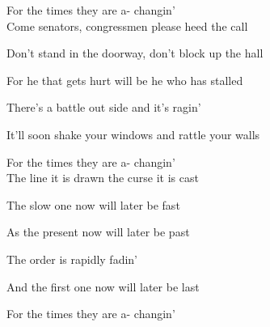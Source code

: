 For the times they are a- changin'\\


Come senators, congressmen please heed the call

Don't stand in the doorway, don't block up the hall

For he that gets hurt will be he who has stalled

There's a battle out side and it's ragin'

It'll soon shake your windows and rattle your walls

For the times they are a- changin'\\


The line it is drawn the curse it is cast

The slow one now will later be fast

As the present now will later be past

The order is rapidly fadin'

And the first one now will later be last

For the times they are a- changin'